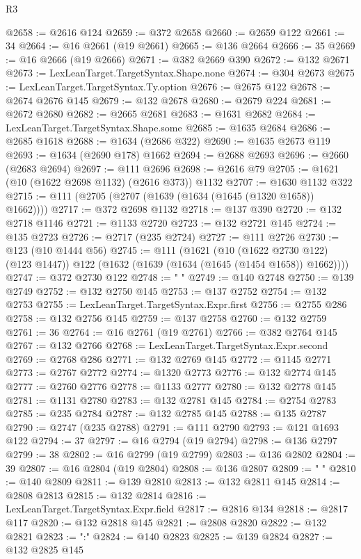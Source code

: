 \begin{lexlean}{R3}
\begin{coremodule}
@2658 := @2616 @124
@2659 := @372 @2658
@2660 := @2659 @122
@2661 := 34
@2664 := @16 @2661 (@19 @2661)
@2665 := @136 @2664
@2666 := 35
@2669 := @16 @2666 (@19 @2666)
@2671 := @382 @2669 @390
@2672 := @132 @2671
@2673 := LexLeanTarget.TargetSyntax.Shape.none
@2674 := @304 @2673
@2675 := LexLeanTarget.TargetSyntax.Ty.option
@2676 := @2675 @122
@2678 := @2674 @2676 @145
@2679 := @132 @2678
@2680 := @2679 @224
@2681 := @2672 @2680
@2682 := @2665 @2681
@2683 := @1631 @2682
@2684 := LexLeanTarget.TargetSyntax.Shape.some
@2685 := @1635 @2684
@2686 := @2685 @1618
@2688 := @1634 (@2686 @322)
@2690 := @1635 @2673 @119
@2693 := @1634 (@2690 @178) @1662
@2694 := @2688 @2693
@2696 := @2660 (@2683 @2694)
@2697 := @111 @2696
@2698 := @2616 @79
@2705 := @1621 (@10 (@1622 @2698 @1132) (@2616 @373)) @1132
@2707 := @1630 @1132 @322
@2715 := @111 (@2705 (@2707 (@1639 (@1634 (@1645 (@1320 @1658)) @1662))))
@2717 := @372 @2698 @1132
@2718 := @137 @390
@2720 := @132 @2718 @1146
@2721 := @1133 @2720
@2723 := @132 @2721 @145
@2724 := @135 @2723
@2726 := @2717 (@235 @2724)
@2727 := @111 @2726
@2730 := @123 (@10 @1444 @56)
@2745 := @111
    (@1621
      (@10 (@1622 @2730 @122) (@123 @1447))
      @122
      (@1632 (@1639 (@1634 (@1645 (@1454 @1658)) @1662))))
@2747 := @372 @2730 @122
@2748 := "            "
@2749 := @140 @2748
@2750 := @139 @2749
@2752 := @132 @2750 @145
@2753 := @137 @2752
@2754 := @132 @2753
@2755 := LexLeanTarget.TargetSyntax.Expr.first
@2756 := @2755 @286
@2758 := @132 @2756 @145
@2759 := @137 @2758
@2760 := @132 @2759
@2761 := 36
@2764 := @16 @2761 (@19 @2761)
@2766 := @382 @2764 @145
@2767 := @132 @2766
@2768 := LexLeanTarget.TargetSyntax.Expr.second
@2769 := @2768 @286
@2771 := @132 @2769 @145
@2772 := @1145 @2771
@2773 := @2767 @2772
@2774 := @1320 @2773
@2776 := @132 @2774 @145
@2777 := @2760 @2776
@2778 := @1133 @2777
@2780 := @132 @2778 @145
@2781 := @1131 @2780
@2783 := @132 @2781 @145
@2784 := @2754 @2783
@2785 := @235 @2784
@2787 := @132 @2785 @145
@2788 := @135 @2787
@2790 := @2747 (@235 @2788)
@2791 := @111 @2790
@2793 := @121 @1693 @122
@2794 := 37
@2797 := @16 @2794 (@19 @2794)
@2798 := @136 @2797
@2799 := 38
@2802 := @16 @2799 (@19 @2799)
@2803 := @136 @2802
@2804 := 39
@2807 := @16 @2804 (@19 @2804)
@2808 := @136 @2807
@2809 := "  "
@2810 := @140 @2809
@2811 := @139 @2810
@2813 := @132 @2811 @145
@2814 := @2808 @2813
@2815 := @132 @2814
@2816 := LexLeanTarget.TargetSyntax.Expr.field
@2817 := @2816 @134
@2818 := @2817 @117
@2820 := @132 @2818 @145
@2821 := @2808 @2820
@2822 := @132 @2821
@2823 := ":"
@2824 := @140 @2823
@2825 := @139 @2824
@2827 := @132 @2825 @145

\end{coremodule}
\end{lexlean}
